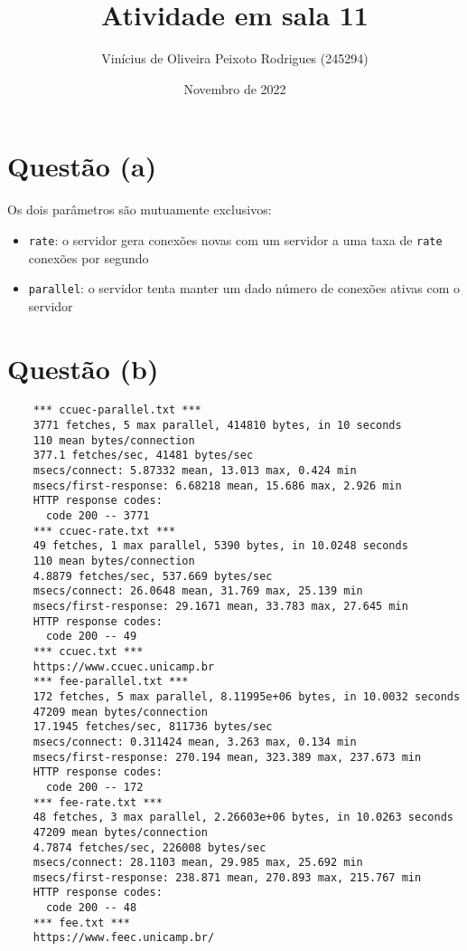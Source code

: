 \documentclass{article}
\title{Atividade em sala 11}
\author{Vinícius de Oliveira Peixoto Rodrigues (245294)}
\date{Novembro de 2022}
\begin{document}
\maketitle

\section*{Questão (a)}

Os dois parâmetros são mutuamente exclusivos:

\begin{itemize}
    \item \texttt{rate}: o servidor gera conexões novas com um servidor a uma taxa de \texttt{rate} conexões por segundo
    \item \texttt{parallel}: o servidor tenta manter um dado número de conexões ativas com o servidor
\end{itemize}

\section*{Questão (b)}

\begin{verbatim}
    *** ccuec-parallel.txt ***
    3771 fetches, 5 max parallel, 414810 bytes, in 10 seconds
    110 mean bytes/connection
    377.1 fetches/sec, 41481 bytes/sec
    msecs/connect: 5.87332 mean, 13.013 max, 0.424 min
    msecs/first-response: 6.68218 mean, 15.686 max, 2.926 min
    HTTP response codes:
      code 200 -- 3771
    *** ccuec-rate.txt ***
    49 fetches, 1 max parallel, 5390 bytes, in 10.0248 seconds
    110 mean bytes/connection
    4.8879 fetches/sec, 537.669 bytes/sec
    msecs/connect: 26.0648 mean, 31.769 max, 25.139 min
    msecs/first-response: 29.1671 mean, 33.783 max, 27.645 min
    HTTP response codes:
      code 200 -- 49
    *** ccuec.txt ***
    https://www.ccuec.unicamp.br
    *** fee-parallel.txt ***
    172 fetches, 5 max parallel, 8.11995e+06 bytes, in 10.0032 seconds
    47209 mean bytes/connection
    17.1945 fetches/sec, 811736 bytes/sec
    msecs/connect: 0.311424 mean, 3.263 max, 0.134 min
    msecs/first-response: 270.194 mean, 323.389 max, 237.673 min
    HTTP response codes:
      code 200 -- 172
    *** fee-rate.txt ***
    48 fetches, 3 max parallel, 2.26603e+06 bytes, in 10.0263 seconds
    47209 mean bytes/connection
    4.7874 fetches/sec, 226008 bytes/sec
    msecs/connect: 28.1103 mean, 29.985 max, 25.692 min
    msecs/first-response: 238.871 mean, 270.893 max, 215.767 min
    HTTP response codes:
      code 200 -- 48
    *** fee.txt ***
    https://www.feec.unicamp.br/
\end{verbatim}
\end{document}
